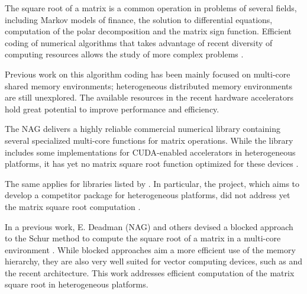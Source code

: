 

The square root of a matrix is a common operation in problems of several fields, including Markov models of finance, the solution to differential equations, computation of the polar decomposition and the matrix sign function. Efficient coding of numerical algorithms that takes advantage of recent diversity of computing resources allows the study of more complex problems \cite{Hill:Marty:2008}.

Previous work on this algorithm coding has been mainly focused on multi-core shared memory environments; heterogeneous distributed memory environments are still unexplored. The available resources in the recent hardware accelerators hold great potential to improve performance and efficiency.

The \acf{NAG}\cite{NAG} delivers a highly reliable commercial numerical library containing several specialized multi-core functions for matrix operations. While the \nag library includes some implementations for CUDA-enabled \gpu accelerators in heterogeneous platforms, it has yet no matrix square root function optimized for these devices \cite{NAG:GPU:0:6}.

The same applies for \gpu libraries listed by \nvidia \cite{ACCELEREYES:WIKI:SQRTM,CULA:LAPACK,NVIDIA:CUBLAS:5:0,NVIDIA:CUSPARSE:5:0,CUSP:FEATURES}.
In particular, the \magma project, which aims to develop a \lapack competitor package for heterogeneous platforms, did not address yet the matrix square root computation \cite{PLASMA:MAGMA}.

In a previous work, E. Deadman (NAG) and others devised a blocked approach to the Schur method to compute the square root of a matrix in a multi-core environment \cite{Deadman:Higham:Ralha:2013}. While blocked approaches aim a more efficient use of the memory hierarchy, they are also very well suited for vector computing devices, such as \gpus and the recent \intel\mic architecture. This work addresses efficient computation of the matrix square root in heterogeneous platforms.
